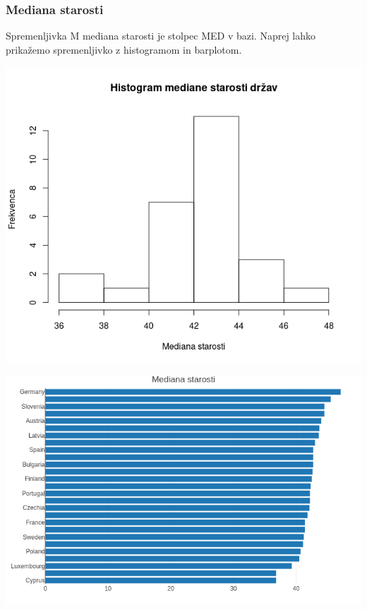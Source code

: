 \documentclass[a4paper,11pt]{article}
\begin{document}
\subsubsection{Mediana starosti}
Spremenljivka M mediana starosti je stolpec MED v bazi. Naprej lahko prikažemo spremenljivko z histogramom in barplotom. \\
\begin{center}
\includegraphics[scale=0.6]{histogram_mediane_starosti}\\
\end{center}
\begin{center}
\includegraphics[scale=0.6]{barplot_mediane_starosti}\\
\end{center}
\end{document}
